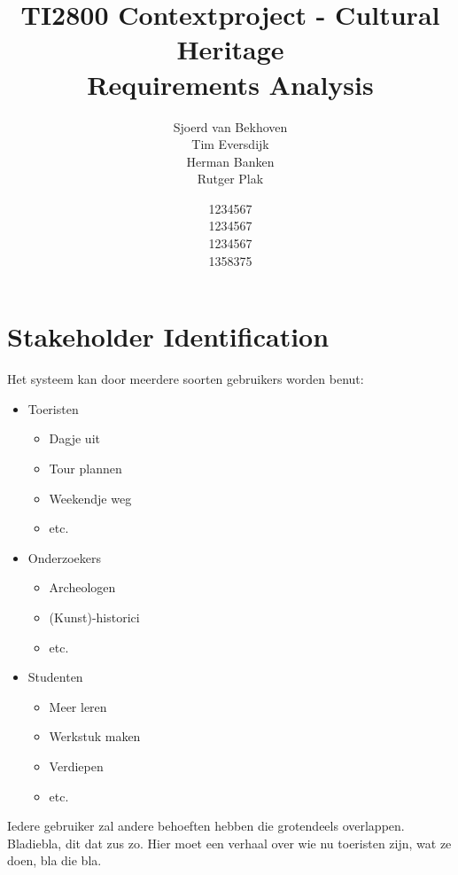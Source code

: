 \documentclass{article}
\begin{document}
\title{TI2800 Contextproject - Cultural Heritage \\ Requirements Analysis}
\author{Sjoerd van Bekhoven \\ Tim Eversdijk \\ Herman Banken \\ Rutger Plak \and 1234567 \\ 1234567 \\ 1234567 \\ 1358375}
\maketitle

\section{Stakeholder Identification}
Het systeem kan door meerdere soorten gebruikers worden benut:
\begin{itemize}
	\item{Toeristen}
	\begin{itemize}
		\item{Dagje uit}
		\item{Tour plannen}
		\item{Weekendje weg}
		\item{etc.}
	\end{itemize}
	\item{Onderzoekers}
	\begin{itemize}
		\item{Archeologen}
		\item{(Kunst)-historici}
		\item{etc.}
	\end{itemize}
	\item{Studenten}
	\begin{itemize}
		\item{Meer leren}
		\item{Werkstuk maken}
		\item{Verdiepen}
		\item{etc.}
	\end{itemize}
\end{itemize}
Iedere gebruiker zal andere behoeften hebben die grotendeels overlappen. Bladiebla, dit dat zus zo. Hier moet een verhaal over wie nu toeristen zijn, wat ze doen, bla die bla.
\end{document}
